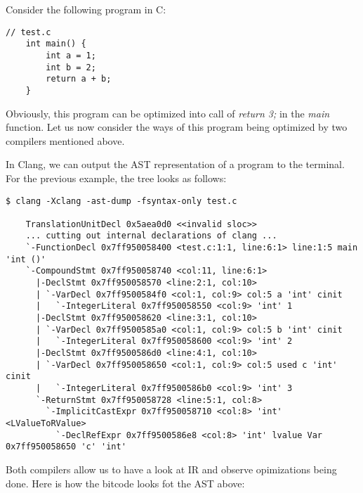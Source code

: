 Consider the following program in C:
\begin{lstlisting}[caption={Example of a C source code}, label=lst:C_Example]
    // test.c
    int main() {
        int a = 1; 
        int b = 2;
        return a + b;
    }
\end{lstlisting}

Obviously, this program can be optimized into call of \textit{return 3;} in the \textit{main} function. Let us now consider the ways of this program being optimized by two compilers mentioned above.


In Clang, we can output the AST representation of a program to the terminal. For the previous example, the tree looks as follows:

\begin{lstlisting}[morekeywords={FunctionDecl, CompoundStmt, DeclStmt, VarDecl, IntegerLiteral, ReturnStmt, TranslationUnitDecl, ImplicitCastExpr, DeclRefExpr}, caption={CLang AST}, label=lst:CLang_AST]
    $ clang -Xclang -ast-dump -fsyntax-only test.c

    TranslationUnitDecl 0x5aea0d0 <<invalid sloc>>
    ... cutting out internal declarations of clang ...
    `-FunctionDecl 0x7ff950058400 <test.c:1:1, line:6:1> line:1:5 main 'int ()'
    `-CompoundStmt 0x7ff950058740 <col:11, line:6:1>
      |-DeclStmt 0x7ff950058570 <line:2:1, col:10>
      | `-VarDecl 0x7ff9500584f0 <col:1, col:9> col:5 a 'int' cinit
      |   `-IntegerLiteral 0x7ff950058550 <col:9> 'int' 1
      |-DeclStmt 0x7ff950058620 <line:3:1, col:10>
      | `-VarDecl 0x7ff9500585a0 <col:1, col:9> col:5 b 'int' cinit
      |   `-IntegerLiteral 0x7ff950058600 <col:9> 'int' 2
      |-DeclStmt 0x7ff9500586d0 <line:4:1, col:10>
      | `-VarDecl 0x7ff950058650 <col:1, col:9> col:5 used c 'int' cinit
      |   `-IntegerLiteral 0x7ff9500586b0 <col:9> 'int' 3
      `-ReturnStmt 0x7ff950058728 <line:5:1, col:8>
        `-ImplicitCastExpr 0x7ff950058710 <col:8> 'int' <LValueToRValue>
          `-DeclRefExpr 0x7ff9500586e8 <col:8> 'int' lvalue Var 0x7ff950058650 'c' 'int'
\end{lstlisting}



Both compilers allow us to have a look at IR and observe opimizations being done. Here is how the bitcode looks fot the AST above:

